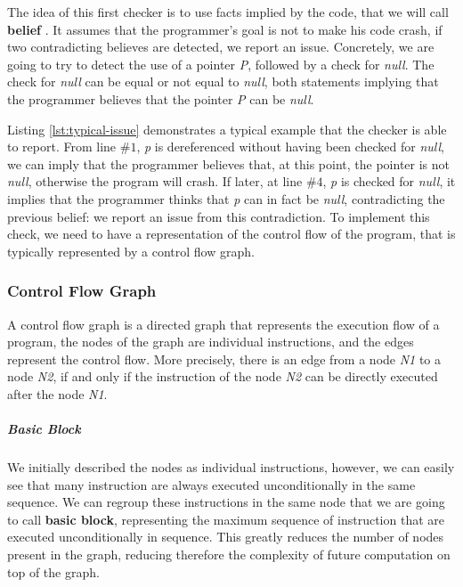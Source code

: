 The idea of this first checker is to use facts implied by the code, that we will call \textbf{belief} \cite{Engler:2001:BDB:502059.502041}.
It assumes that the programmer’s goal is not to make his code crash, if two contradicting believes are detected, we report an issue.
Concretely, we are going to try to detect the use of a pointer \emph{P}, followed by a check for \emph{null}. The check for \emph{null} can be equal or not equal to \emph{null}, both statements implying that the programmer believes that the pointer \emph{P} can be \emph{null}.



Listing \ref{lst:typical-issue} demonstrates a typical example that the checker is able to report. 
From line $\#1$, \emph{p} is dereferenced without having been checked for \emph{null}, we can imply that the programmer believes that, at this point, the pointer is not \emph{null}, otherwise the program will crash. 
If later, at line $\#4$, \emph{p} is checked for \emph{null}, it implies that the programmer thinks that \emph{p} can in fact be \emph{null}, contradicting the previous belief: we report an issue from this contradiction.
To implement this check, we need to have a representation of the control flow of the program, that is typically represented by a control flow graph.

\subsubsection{Control Flow Graph}
\label{subsubsec:control_flow_graph}

A control flow graph is a directed graph that represents the execution flow of a program, the nodes of the graph are individual instructions, and the edges represent the control flow. More precisely, there is an edge from a node \emph{N1} to a node \emph{N2}, if and only if the instruction of the node \emph{N2} can be directly executed after the node \emph{N1}.


\subparagraph{Basic Block}
We initially described the nodes as individual instructions, however, we can easily see that many instruction are always executed unconditionally in the same sequence.
We can regroup these instructions in the same node that we are going to call \textbf{basic block}, representing the maximum sequence of instruction that are executed unconditionally in sequence. 
This greatly reduces the number of nodes present in the graph, reducing therefore the complexity of future computation on top of the graph.

